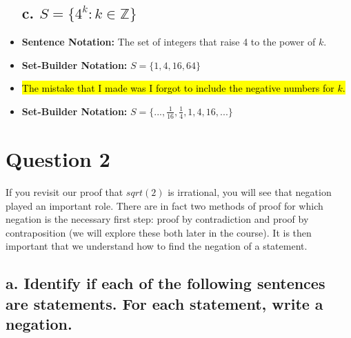 \documentclass{article}
\begin{document}
\begin{itemize}
    \subsection*{c. $S = \{4^k : k \in \mathbb{Z}\}$}
    \item[] \textbf{Sentence Notation: } The set of integers that raise 4 to the power of $k$.
    \item[] \textbf{Set-Builder Notation: } $S = \{1, 4, 16, 64\}$
    \item[] \hl{The mistake that I made was I forgot to include the negative numbers for $k$.}
    \item[] \textbf{Set-Builder Notation: } $S = \{... ,\frac{1}{16},\frac{1}{4},1, 4, 16,...\}$
\end{itemize} 
\newpage
\section*{Question 2}
If you revisit our proof that $sqrt(2)$ is irrational, you will see that negation played an
important role. There are in fact two methods of proof for which negation is the
necessary first step: proof by contradiction and proof by contraposition (we will
explore these both later in the course). It is then important that we understand
how to find the negation of a statement.
\subsection*{a. Identify if each of the following sentences are statements. For each statement, write a negation.}
\end{document}
